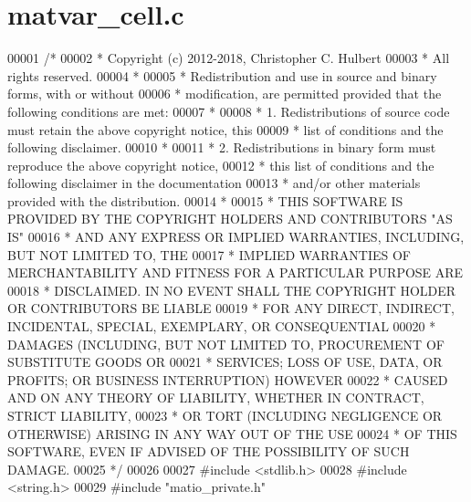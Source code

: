 \hypertarget{matvar__cell_8c_source}{}\section{matvar\+\_\+cell.\+c}
\label{matvar__cell_8c_source}

\begin{DoxyCode}
00001 \textcolor{comment}{/*}
00002 \textcolor{comment}{ * Copyright (c) 2012-2018, Christopher C. Hulbert}
00003 \textcolor{comment}{ * All rights reserved.}
00004 \textcolor{comment}{ *}
00005 \textcolor{comment}{ * Redistribution and use in source and binary forms, with or without}
00006 \textcolor{comment}{ * modification, are permitted provided that the following conditions are met:}
00007 \textcolor{comment}{ *}
00008 \textcolor{comment}{ * 1. Redistributions of source code must retain the above copyright notice, this}
00009 \textcolor{comment}{ *    list of conditions and the following disclaimer.}
00010 \textcolor{comment}{ *}
00011 \textcolor{comment}{ * 2. Redistributions in binary form must reproduce the above copyright notice,}
00012 \textcolor{comment}{ *    this list of conditions and the following disclaimer in the documentation}
00013 \textcolor{comment}{ *    and/or other materials provided with the distribution.}
00014 \textcolor{comment}{ *}
00015 \textcolor{comment}{ * THIS SOFTWARE IS PROVIDED BY THE COPYRIGHT HOLDERS AND CONTRIBUTORS "AS IS"}
00016 \textcolor{comment}{ * AND ANY EXPRESS OR IMPLIED WARRANTIES, INCLUDING, BUT NOT LIMITED TO, THE}
00017 \textcolor{comment}{ * IMPLIED WARRANTIES OF MERCHANTABILITY AND FITNESS FOR A PARTICULAR PURPOSE ARE}
00018 \textcolor{comment}{ * DISCLAIMED. IN NO EVENT SHALL THE COPYRIGHT HOLDER OR CONTRIBUTORS BE LIABLE}
00019 \textcolor{comment}{ * FOR ANY DIRECT, INDIRECT, INCIDENTAL, SPECIAL, EXEMPLARY, OR CONSEQUENTIAL}
00020 \textcolor{comment}{ * DAMAGES (INCLUDING, BUT NOT LIMITED TO, PROCUREMENT OF SUBSTITUTE GOODS OR}
00021 \textcolor{comment}{ * SERVICES; LOSS OF USE, DATA, OR PROFITS; OR BUSINESS INTERRUPTION) HOWEVER}
00022 \textcolor{comment}{ * CAUSED AND ON ANY THEORY OF LIABILITY, WHETHER IN CONTRACT, STRICT LIABILITY,}
00023 \textcolor{comment}{ * OR TORT (INCLUDING NEGLIGENCE OR OTHERWISE) ARISING IN ANY WAY OUT OF THE USE}
00024 \textcolor{comment}{ * OF THIS SOFTWARE, EVEN IF ADVISED OF THE POSSIBILITY OF SUCH DAMAGE.}
00025 \textcolor{comment}{ */}
00026 
00027 \textcolor{preprocessor}{#include <stdlib.h>}
00028 \textcolor{preprocessor}{#include <string.h>}
00029 \textcolor{preprocessor}{#include "matio\_private.h"}

\end{DoxyCode}

